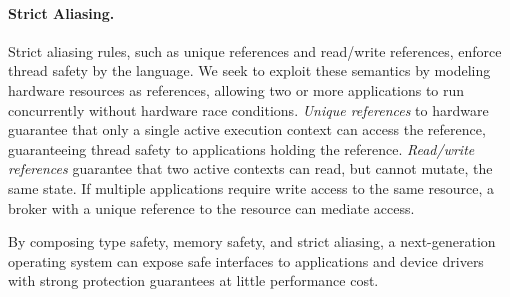 \paragraph{Strict Aliasing.}
Strict aliasing rules, such as unique references and read/write references,
enforce thread safety
by the language. We seek to
exploit these semantics
by modeling
hardware resources as references, allowing two or more applications to run
concurrently without
hardware race conditions.
\textit{Unique references}
to hardware
guarantee that only a single active execution context
can access the reference,
guaranteeing thread safety to applications holding the reference.
\textit{Read/write references} guarantee that two active contexts can read, but cannot mutate,
the same state.
If multiple applications require write access to the same resource, a broker with a
unique reference to the resource can mediate access.

By composing type safety, memory safety, and strict aliasing, a next-generation
operating system can expose safe interfaces to applications and device drivers
with strong protection guarantees at little performance cost.
